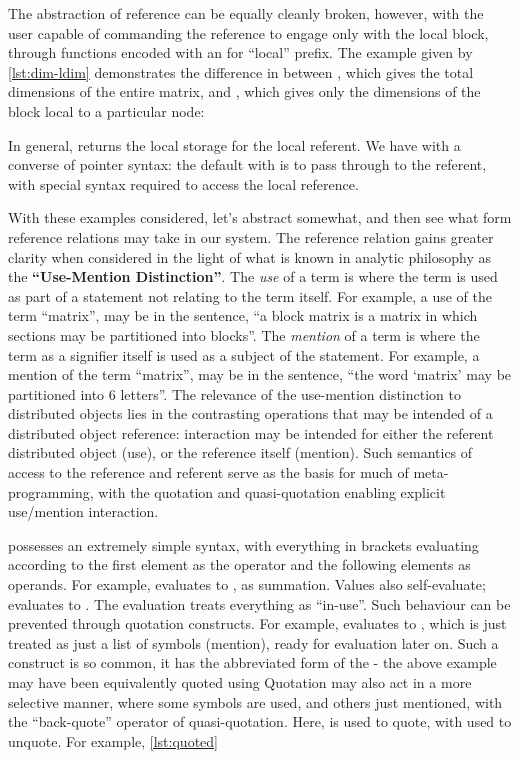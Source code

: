 The abstraction of reference can be equally cleanly broken, however, with the user capable of commanding the reference to engage only with the local block, through functions encoded with an  for ``local'' prefix.
The example given by \cref{lst:dim-ldim} demonstrates the difference in  between , which gives the total dimensions of the entire matrix, and , which gives only the dimensions of the block local to a particular node:


In general,  returns the local storage for the  local referent.
We have with  a converse of pointer syntax: the default with  is to pass through to the referent, with special syntax required to access the local reference.

With these examples considered, let's abstract somewhat, and then see what form reference relations may take in our system.
The reference relation gains greater clarity when considered in the light of what is known in analytic philosophy as the \textbf{``Use-Mention Distinction''}\cite{quine2009}.
The \emph{use} of a term is where the term is used as part of a statement not relating to the term itself.
For example, a use of the term ``matrix'', may be in the sentence, ``a block matrix is a matrix in which sections may be partitioned into blocks''.
The \emph{mention} of a term is where the term as a signifier itself is used as a subject of the statement.
For example, a mention of the term ``matrix'', may be in the sentence, ``the word `matrix' may be partitioned into 6 letters''.
The relevance of the use-mention distinction to distributed objects lies in the contrasting operations that may be intended of a distributed object reference: interaction may be intended for either the referent distributed object (use), or the reference itself (mention).
Such semantics of access to the reference and referent serve as the basis for much of meta-programming, with the  quotation and quasi-quotation enabling explicit use/mention interaction.

 possesses an extremely simple syntax, with everything in brackets
evaluating according to the first element as the operator and the
following elements as operands.
For example,  evaluates to , as summation.
Values also self-evaluate;  evaluates to .
The evaluation treats everything as ``in-use''.
Such behaviour can be prevented through quotation constructs.
For example,  evaluates to , which is just treated as just a list of symbols (mention), ready for evaluation later on.
Such a construct is so common, it has the abbreviated form of the  - the above example may have been equivalently quoted using  Quotation may also act in a more selective manner, where some symbols are used, and others just mentioned, with the ``back-quote'' operator of quasi-quotation.
Here,  is used to quote, with  used to unquote.
For example, \cref{lst:quoted}

